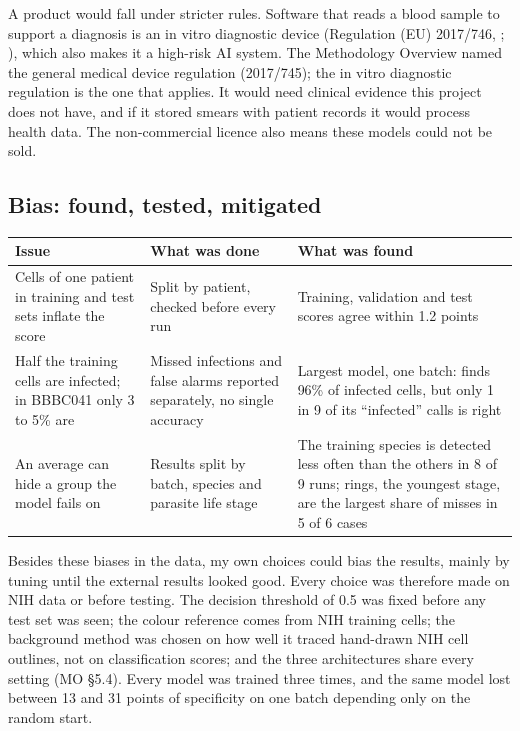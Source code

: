 \documentclass[11pt,a4paper]{article}
\begin{document}
A product would fall under stricter rules. Software that reads a blood sample to support a diagnosis is an in vitro diagnostic device (Regulation (EU) 2017/746, \citealp{ivdr2017}; \citealp{mdcg2019}), which also makes it a high-risk AI system. The Methodology Overview named the general medical device regulation (2017/745); the in vitro diagnostic regulation is the one that applies. It would need clinical evidence this project does not have, and if it stored smears with patient records it would process health data. The non-commercial licence also means these models could not be sold.

\subsection{Bias: found, tested, mitigated}

{\small
\begin{longtable}{@{}>{\raggedright\arraybackslash}p{102.3pt}>{\raggedright\arraybackslash}p{119.0pt}>{\raggedright\arraybackslash}p{182.7pt}@{}}
\toprule
Issue & What was done & What was found \\
\midrule
\endhead
\bottomrule
\endfoot
\bottomrule
\endlastfoot
Cells of one patient in training and test sets inflate the score & Split by patient, checked before every run & Training, validation and test scores agree within 1.2 points \\
Half the training cells are infected; in BBBC041 only 3 to 5\% are & Missed infections and false alarms reported separately, no single accuracy & Largest model, one batch: finds 96\% of infected cells, but only 1 in 9 of its ``infected'' calls is right \\
An average can hide a group the model fails on & Results split by batch, species and parasite life stage & The training species is detected less often than the others in 8 of 9 runs; rings, the youngest stage, are the largest share of misses in 5 of 6 cases \\
\end{longtable}}
\addtocounter{table}{-1}

Besides these biases in the data, my own choices could bias the results, mainly by tuning until the external results looked good. Every choice was therefore made on NIH data or before testing. The decision threshold of 0.5 was fixed before any test set was seen; the colour reference comes from NIH training cells; the background method was chosen on how well it traced hand-drawn NIH cell outlines, not on classification scores; and the three architectures share every setting (MO \S{}5.4). Every model was trained three times, and the same model lost between 13 and 31 points of specificity on one batch depending only on the random start.
\end{document}
